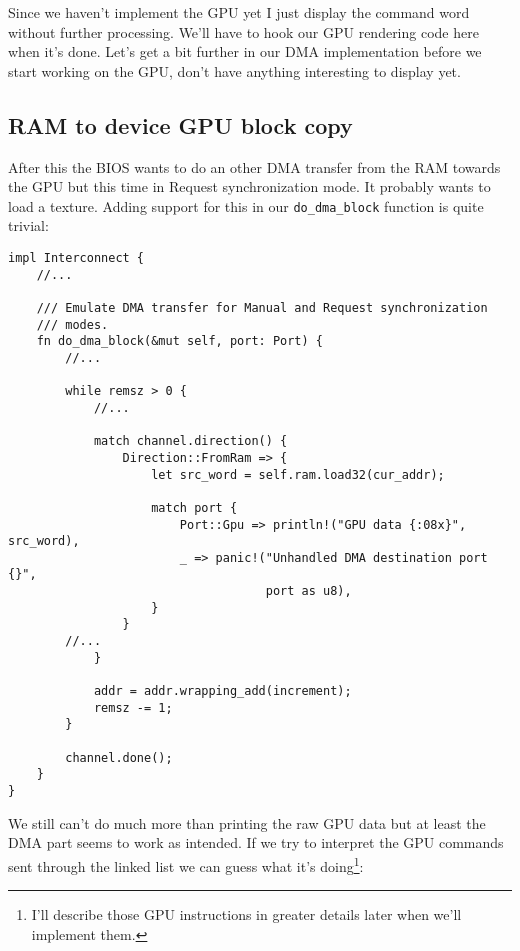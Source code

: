 \documentclass[a4paper]{article}
\newcommand{\code}[1] {\texttt{#1}}
\begin{document}
Since we haven't implement the GPU yet I just display the command word
without further processing. We'll have to hook our GPU rendering code
here when it's done. Let's get a bit further in our DMA implementation
before we start working on the GPU, don't have anything interesting to
display yet.

\subsection{RAM to device GPU block copy}

After this the BIOS wants to do an other DMA transfer from the RAM
towards the GPU but this time in Request synchronization mode. It
probably wants to load a texture. Adding support for this in our
\code{do\_dma\_block} function is quite trivial:

\begin{lstlisting}
impl Interconnect {
    //...

    /// Emulate DMA transfer for Manual and Request synchronization
    /// modes.
    fn do_dma_block(&mut self, port: Port) {
        //...

        while remsz > 0 {
            //...

            match channel.direction() {
                Direction::FromRam => {
                    let src_word = self.ram.load32(cur_addr);

                    match port {
                        Port::Gpu => println!("GPU data {:08x}", src_word),
                        _ => panic!("Unhandled DMA destination port {}",
                                    port as u8),
                    }
                }
		//...
            }

            addr = addr.wrapping_add(increment);
            remsz -= 1;
        }

        channel.done();
    }
}
\end{lstlisting}

We still can't do much more than printing the raw GPU data but at
least the DMA part seems to work as intended. If we try to interpret
the GPU commands sent through the linked list we can guess what it's
doing\footnote{I'll describe those GPU instructions in greater details
  later when we'll implement them.}:
\end{document}
